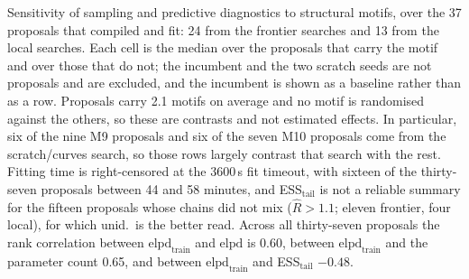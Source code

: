 \documentclass[11pt]{article}
\begin{document}
\begin{table}
  \caption{Sensitivity of sampling and predictive diagnostics to structural motifs, over the 37 proposals that compiled and fit: 24 from the frontier searches and 13 from the local searches. Each cell is the median over the proposals that carry the motif and over those that do not; the incumbent and the two scratch seeds are not proposals and are excluded, and the incumbent is shown as a baseline rather than as a row. Proposals carry 2.1 motifs on average and no motif is randomised against the others, so these are contrasts and not estimated effects. In particular, six of the nine M9 proposals and six of the seven M10 proposals come from the scratch/curves search, so those rows largely contrast that search with the rest. Fitting time is right-censored at the 3600\,s fit timeout, with sixteen of the thirty-seven proposals between 44 and 58 minutes, and ESS$_{\mathrm{tail}}$ is not a reliable summary for the fifteen proposals whose chains did not mix ($\hat{R} > 1.1$; eleven frontier, four local), for which unid.\ is the better read. Across all thirty-seven proposals the rank correlation between $\mathrm{elpd}_{\mathrm{train}}$ and $\mathrm{elpd}$ is 0.60, between $\mathrm{elpd}_{\mathrm{train}}$ and the parameter count 0.65, and between $\mathrm{elpd}_{\mathrm{train}}$ and ESS$_{\mathrm{tail}}$ $-0.48$.}
  \label{tab:motif_sensitivity}
\end{table}
\end{document}
